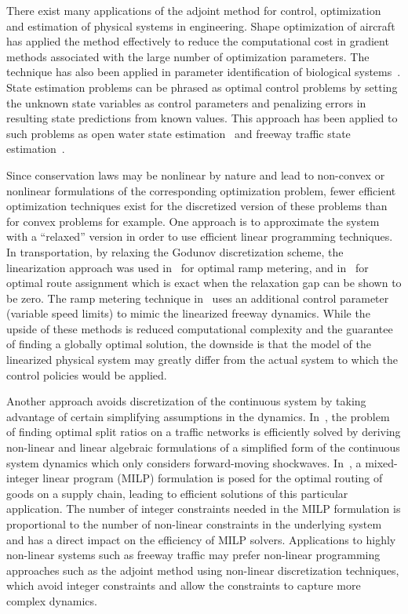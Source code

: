 There exist many applications of the adjoint method for control, optimization 
and estimation of physical systems in engineering. Shape optimization of 
aircraft~\cite{Reuther1996,Giles1997,Moin1994} has applied the method 
effectively to reduce the computational cost in gradient methods associated 
with the large number of optimization parameters. The technique has also been 
applied in parameter identification of biological systems~\cite{Raffard2008}. 
State estimation problems can be phrased as optimal control problems by setting 
the unknown state variables as control parameters and penalizing errors in 
resulting state predictions from known values. This approach has been applied 
to such problems as open water state estimation~\cite{Castaings2006,Strub2009} 
and freeway traffic state estimation~\cite{Jacqueta}.

Since conservation laws may be nonlinear by nature and lead to non-convex or 
nonlinear formulations of the corresponding optimization problem, fewer 
efficient optimization techniques exist for the 
discretized version of these problems than for convex problems for example. One 
approach is to approximate the system with a ``relaxed'' version in order to 
use efficient linear programming techniques. In transportation, by 
relaxing the Godunov discretization scheme, the linearization approach was used 
in~\cite{gomes2006optimal} for optimal ramp metering, and 
in~\cite{ziliaskopoulos2000linear} for optimal route assignment which is exact 
when the relaxation gap can be shown to be zero. The ramp 
metering technique in~\cite{Muralidharana} uses an additional control parameter 
(variable speed limits) to mimic the linearized freeway dynamics. While the 
upside of these methods is reduced computational complexity and the guarantee 
of finding a globally optimal solution, the downside is that the model of the 
linearized physical system may greatly differ from the actual system to which 
the control policies would be applied.

Another approach avoids discretization of the continuous system by taking advantage of certain simplifying assumptions in the dynamics. In~\cite{Fugenschuh2006Combinatorial}, the problem of finding optimal split ratios on a traffic networks is efficiently solved by deriving non-linear and linear algebraic formulations of a simplified form of the continuous system dynamics which only considers forward-moving shockwaves. In~\cite{Apice2010Modeling}, a mixed-integer linear program (MILP) formulation is posed for the optimal routing of goods on a supply chain, leading to efficient solutions of this particular application. The number of integer constraints needed in the MILP formulation is proportional to the number of non-linear constraints in the underlying system and has a direct impact on the efficiency of MILP solvers. Applications to highly non-linear systems such as freeway traffic may prefer non-linear programming approaches such as the adjoint method using non-linear discretization techniques, which avoid integer constraints and allow the constraints to capture more complex dynamics.

